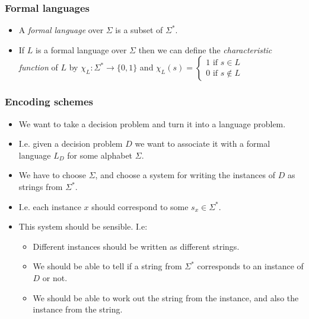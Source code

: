 \documentclass[handout]{beamer}
\begin{document}
\begin{frame}
\frametitle{Formal languages}
\begin{itemize}
\item A \emph{formal language} over $\Sigma$ is a subset of $\Sigma^*$.
\vspace{0.5cm}
\item If $L$ is a formal language over $\Sigma$ then we can define the \emph{characteristic function} of $L$ by $\chi_L:\Sigma^*\to\{0,1\}$ and $\chi_L(s) = \begin{cases}1 \text{ if } s\in L \\
0 \text{ if } s\notin L \end{cases}$  
\end{itemize}
\end{frame}

\begin{frame}
\frametitle{Encoding schemes}
\begin{itemize}
\item We want to take a decision problem and turn it into a language problem.
\vspace{0.2cm}
\item I.e. given a decision problem $D$ we want to associate it with a formal language $L_D$ for some alphabet $\Sigma$.
\vspace{0.2cm}
\item We have to choose $\Sigma$, and choose a system for writing the instances of $D$ as strings from $\Sigma^*$.
\vspace{0.2cm}
\item I.e. each instance $x$ should correspond to some $s_x\in\Sigma^*$. 
\vspace{0.2cm}
\item This system should be sensible. I.e:
\begin{itemize}
\item Different instances should be written as different strings.
\item We should be able to tell if a string from $\Sigma^*$ corresponds to an instance of $D$ or not.
\item We should be able to work out the string from the instance, and also the instance from the string.
\end{itemize}
\end{itemize}
\end{frame}
\end{document}
